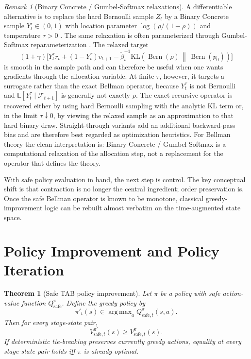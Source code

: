 \documentclass{article}
\newtheorem{theorem}{Theorem}[section]
\theoremstyle{remark}
\newtheorem{remark}[remark]{Remark}
\DeclareMathOperator*{\argmax}{arg\,max}
\DeclareMathOperator{\Bern}{Bern}
\newcommand{\E}{\mathbb{E}}
\newcommand{\KL}{\mathrm{KL}}
\newcommand{\pprior}{p_0}
\newcommand{\KLbin}[2]{\KL\!\left(\Bern(#1)\,\middle\|\,\Bern(#2)\right)}
\newcommand{\safe}{\mathrm{safe}}
\begin{document}
\begin{remark}[Binary Concrete / Gumbel-Softmax relaxations]
\label{rem:gumbel-relaxation}
A differentiable alternative is to replace the hard Bernoulli sample $Z_t$ by a Binary Concrete sample $Y_t^\tau\in(0,1)$ with location parameter $\log(\rho/(1-\rho))$ and temperature $\tau>0$ \citep{maddison2017concrete}. The same relaxation is often parameterized through Gumbel-Softmax reparameterization \citep{jang2017categorical}.
The relaxed target
\[
(1+\gamma)\bigl[Y_t^\tau r_t +(1-Y_t^\tau)v_{t+1} - \widetilde\beta_t^{-1}\KLbin{\rho}{\pprior}\bigr]
\]
is smooth in the sample path and can therefore be useful when one wants gradients through the allocation variable.
At finite $\tau$, however, it targets a surrogate rather than the exact Bellman operator, because $Y_t^\tau$ is not Bernoulli and $\E[Y_t^\tau\mid \mathcal F_{t+1}]$ is generally not exactly $\rho$.
The exact recursive operator is recovered either by using hard Bernoulli sampling with the analytic KL term or, in the limit $\tau\downarrow 0$, by viewing the relaxed sample as an approximation to that hard binary draw.
Straight-through variants add an additional backward-pass bias and are therefore best regarded as optimization heuristics.
For Bellman theory the clean interpretation is: Binary Concrete / Gumbel-Softmax is a computational relaxation of the allocation step, not a replacement for the operator that defines the theory.
\end{remark}

With safe policy evaluation in hand, the next step is control.
The key conceptual shift is that contraction is no longer the central ingredient; order preservation is.
Once the safe Bellman operator is known to be monotone, classical greedy-improvement logic can be rebuilt almost verbatim on the time-augmented state space.

\section{Policy Improvement and Policy Iteration}
\label{sec:policy-iteration}

\begin{theorem}[Safe TAB policy improvement]
\label{thm:policy-improvement}
Let $\pi$ be a policy with safe action-value function $Q_\safe^\pi$.
Define the greedy policy by
\[
\pi'_t(s)\in\argmax_a Q_{\safe,t}^\pi(s,a).
\]
Then for every stage-state pair,
\begin{equation}
V_{\safe,t}^{\pi'}(s)\ge V_{\safe,t}^{\pi}(s).
\label{eq:safe-policy-improvement}
\end{equation}
If deterministic tie-breaking preserves currently greedy actions, equality at every stage-state pair holds iff $\pi$ is already optimal.
\end{theorem}
\end{document}

